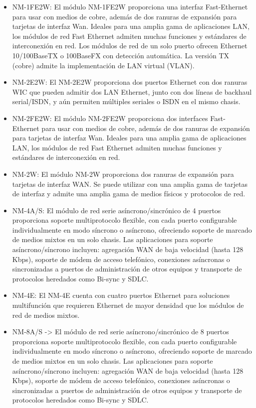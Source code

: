 \documentclass{article}
\begin{document}
\begin{itemize}
    \item NM-1FE2W: El módulo NM-1FE2W proporciona una interfaz Fast-Ethernet para usar con medios de cobre, además de dos ranuras de expansión para tarjetas de interfaz Wan. Ideales para una amplia gama de aplicaciones LAN, los módulos de red Fast Ethernet admiten muchas funciones y estándares de interconexión en red. Los módulos de red de un solo puerto ofrecen Ethernet 10/100BaseTX o 100BaseFX con detección automática. La versión TX (cobre) admite la implementación de LAN virtual (VLAN).

    \item NM-2E2W: El NM-2E2W proporciona dos puertos Ethernet con dos ranuras WIC que pueden admitir dos LAN Ethernet, junto con dos líneas de backhaul serial/ISDN, y aún permiten múltiples seriales o ISDN en el mismo chasis.

    \item NM-2FE2W: El módulo NM-2FE2W proporciona dos interfaces Fast-Ethernet para usar con medios de cobre, además de dos ranuras de expansión para tarjetas de interfaz Wan. Ideales para una amplia gama de aplicaciones LAN, los módulos de red Fast Ethernet admiten muchas funciones y estándares de interconexión en red.

    \item NM-2W: El módulo NM-2W proporciona dos ranuras de expansión para tarjetas de interfaz WAN. Se puede utilizar con una amplia gama de tarjetas de interfaz y admite una amplia gama de medios físicos y protocolos de red.

    \item NM-4A/S: El módulo de red serie asíncrono/sincrónico de 4 puertos proporciona soporte multiprotocolo flexible, con cada puerto configurable individualmente en modo síncrono o asíncrono, ofreciendo soporte de marcado de medios mixtos en un solo chasis. Las aplicaciones para soporte asíncrono/síncrono incluyen: agregación WAN de baja velocidad (hasta 128 Kbps), soporte de módem de acceso telefónico, conexiones asíncronas o sincronizadas a puertos de administración de otros equipos y transporte de protocolos heredados como Bi-sync y SDLC.

    \item NM-4E: El NM-4E cuenta con cuatro puertos Ethernet para soluciones multifunción que requieren Ethernet de mayor densidad que los módulos de red de medios mixtos.

    \item NM-8A/S -> El módulo de red serie asíncrono/sincrónico de 8 puertos proporciona soporte multiprotocolo flexible, con cada puerto configurable individualmente en modo síncrono o asíncrono, ofreciendo soporte de marcado de medios mixtos en un solo chasis. Las aplicaciones para soporte asíncrono/síncrono incluyen: agregación WAN de baja velocidad (hasta 128 Kbps), soporte de módem de acceso telefónico, conexiones asíncronas o sincronizadas a puertos de administración de otros equipos y transporte de protocolos heredados como Bi-sync y SDLC.


\end{itemize}
\end{document}
